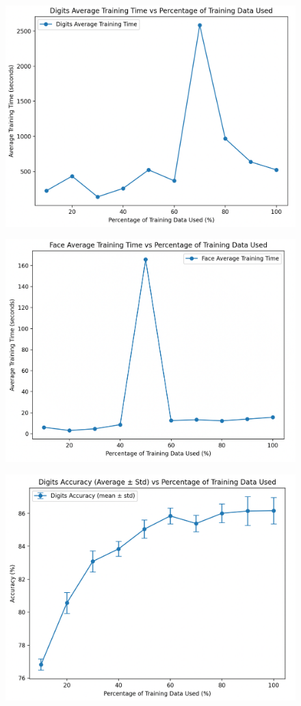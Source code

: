 \documentclass{article}
\begin{document}
\begin{figure}[H]
    \centering
    \includegraphics[width=.75\textwidth]{report/report_figures/nn_digits_time.png}
\end{figure}
\begin{figure}[H]
    \centering
    \includegraphics[width=.75\textwidth]{report/report_figures/nn_face_time.png}
\end{figure}
\begin{figure}[H]
    \centering
    \includegraphics[width=.75\textwidth]{report/report_figures/nn_digits_acc.png}
\end{figure}
\end{document}
